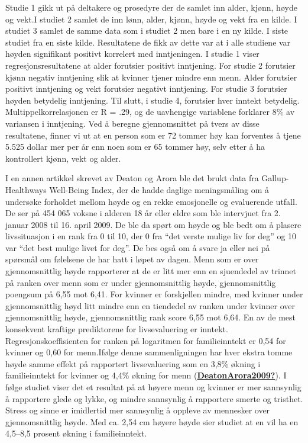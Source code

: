 \documentclass[
  12pt,
  norsk,
]{article}
\begin{document}
Studie 1 gikk ut på deltakere og prosedyre der de samlet inn alder,
kjønn, høyde og vekt.I studiet 2 samlet de inn lønn, alder, kjønn, høyde
og vekt fra en kilde. I studiet 3 samlet de samme data som i studiet 2
men bare i en ny kilde. I siste studiet fra en siste kilde. Resultatene
de fikk av dette var at i alle studiene var høyden signifikant positivt
korrelert med inntjeningen. I studie 1 viser regresjonsresultatene at
alder forutsier positivt inntjening. For studie 2 forutsier kjønn
negativ inntjening slik at kvinner tjener mindre enn menn. Alder
forutsier positivt inntjening og vekt forutsier negativt inntjening. For
studie 3 forutsier høyden betydelig inntjening. Til slutt, i studie 4,
forutsier hver inntekt betydelig. Multippelkorrelasjonen er R = .29, og
de uavhengige variablene forklarer 8\% av variansen i inntjening. Ved å
beregne gjennomsnittet på tvers av disse resultatene, finner vi ut at en
person som er 72 tommer høy kan forventes å tjene 5.525 dollar mer per
år enn noen som er 65 tommer høy, selv etter å ha kontrollert kjønn,
vekt og alder.

I en annen artikkel skrevet av Deaton og Arora ble det brukt data fra
Gallup-Healthways Well-Being Index, der de hadde daglige meningsmåling
om å undersøke forholdet mellom høyde og en rekke emosjonelle og
evaluerende utfall. De ser på 454 065 voksne i alderen 18 år eller eldre
som ble intervjuet fra 2. januar 2008 til 16. april 2009. De ble da
spørt om høyde og ble bedt om å plasere livssituasjon i en rank fra 0
til 10, der 0 fra ``det verste mulige liv for deg'' og 10 var ``det best
mulige livet for deg''. De bes også om å svare ja eller nei på spørsmål
om følelsene de har hatt i løpet av dagen. Menn som er over
gjennomsnittlig høyde rapporterer at de er litt mer enn en sjuendedel av
trinnet på ranken over menn som er under gjennomsnittlig høyde,
gjennomsnittlig poengsum på 6,55 mot 6,41. For kvinner er forskjellen
mindre, med kvinner under gjennomsnittlig høyd litt mindre enn en
tiendedel av ranken under kvinner over gjennomsnittlig høyde,
gjennomsnittlig rank score 6,55 mot 6,64. En av de mest konsekvent
kraftige prediktorene for livsevaluering er inntekt.
Regresjonskoeffisienten for ranken på logaritmen for familieinntekt er
0,54 for kvinner og 0,60 for menn.Ifølge denne sammenligningen har hver
ekstra tomme høyde samme effekt på rapportert livsevaluering som en
3,8\% økning i familieinntekt for kvinner og 4,4\% økning for menn
(\protect\hyperlink{ref-DeatonArora2009}{\textbf{DeatonArora2009?}}). I
følge studiet viser det et resultat på at høyere menn og kvinner er mer
sannsynlig å rapportere glede og lykke, og mindre sannsynlig å
rapportere smerte og tristhet. Stress og sinne er imidlertid mer
sannsynlig å oppleve av mennesker over gjennomsnittlig høyde. Med ca.
2,54 cm høyere høyde sier studiet at en vil ha en 4,5--8,5 prosent
økning i familieinntekt.
\end{document}
